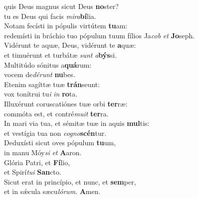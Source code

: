 \oddverse  quis Deus magnus sicut Deus \textbf{no}ster?~\*\\
\oddverse tu es Deus qui facis \textit{mi}\textit{ra}\textbf{bí}lia.\\
\evenverse Notam fecísti in pópulis virtútem \textbf{tu}am:~\*\\
\evenverse redemísti in bráchio tuo pópulum tuum fílios Ja\textit{cob} \textit{et} \textbf{Jo}seph.\\
\oddverse Vidérunt te aquæ, Deus, vidérunt te \textbf{a}quæ:~\*\\
\oddverse et timuérunt et turbátæ \textit{sunt} \textit{a}\textbf{býs}si.\\
\evenverse Multitúdo sónitus a\textbf{quá}rum:~\*\\
\evenverse vocem de\textit{dé}\textit{runt} \textbf{nu}bes.\\
\oddverse Etenim sagíttæ tuæ \textbf{trán}seunt:~\*\\
\oddverse vox tonítrui tu\textit{i} \textit{in} \textbf{ro}ta.\\
\evenverse Illuxérunt coruscatiónes tuæ orbi \textbf{ter}ræ:~\*\\
\evenverse commóta est, et contré\textit{mu}\textit{it} \textbf{ter}ra.\\
\oddverse In mari via tua, et sémitæ tuæ in aquis \textbf{mul}tis:~\*\\
\oddverse et vestígia tua non \textit{co}\textit{gno}\textbf{scén}tur.\\
\evenverse Deduxísti sicut oves pópulum \textbf{tu}um,~\*\\
\evenverse in manu Móy\textit{si} \textit{et} \textbf{A}aron.\\
\oddverse Glória Patri, et \textbf{Fí}lio,~\*\\
\oddverse et Spirí\textit{tu}\textit{i} \textbf{San}cto.\\
\evenverse Sicut erat in princípio, et nunc, et \textbf{sem}per,~\*\\
\evenverse et in sǽcula sæcu\textit{ló}\textit{rum}. \textbf{A}men.\\
